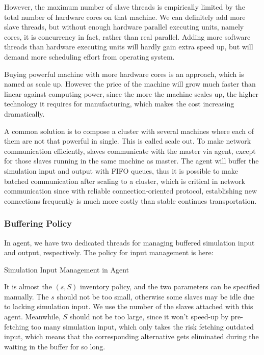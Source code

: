 However, the maximum number of slave threads is empirically limited by the total number of hardware cores on that machine. We can definitely add more slave threads, but without enough hardware parallel executing units, namely cores, it is concurrency in fact, rather than real parallel. Adding more software threads than hardware executing units will hardly gain extra speed up, but will demand more scheduling effort from operating system.

Buying powerful machine with more hardware cores is an approach, which is named as scale up. However the price of the machine will grow much faster than linear against computing power, since the more the machine scales up, the higher technology it requires for manufacturing, which makes the cost increasing dramatically.

A common solution is to compose a cluster with several machines where each of them are not that powerful in single. This is called scale out. To make network communication efficiently, slaves communicate with the master via agent, except for those slaves running in the same machine as master. The agent will buffer the simulation input and output with FIFO queues, thus it is possible to make batched communication after scaling to a cluster, which is critical in network communication since with reliable connection-oriented protocol, establishing new connections frequently is much more costly than stable continues transportation.

\subsubsection{Buffering Policy}

In agent, we have two dedicated threads for managing buffered simulation input and output, respectively. The policy for input management is here:

\begin{algorithm}
\begin{algorithmic}[1]
    \EndFor
  \Else
  \EndIf
\EndWhile
\end{algorithmic}
\caption{Simulation Input Management in Agent}
\label{input_buf_alg}
\end{algorithm}

It is almost the $(s, S)$ inventory policy, and the two parameters can be specified manually. The $s$ should not be too small, otherwise some slaves may be idle due to lacking simulation input. We use the number of the slaves attached with this agent. Meanwhile, $S$ should not be too large, since it won't speed-up by pre-fetching too many simulation input, which only takes the risk fetching outdated input, which means that the corresponding alternative gets eliminated during the waiting in the buffer for so long.

